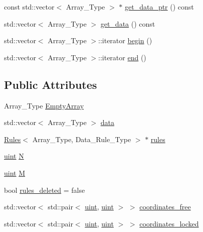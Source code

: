 \textbf{ }\par
\begin{DoxyCompactItemize}
\item 
const std\+::vector$<$ Array\+\_\+\+Type $>$ $\ast$ \hyperlink{classbarry_1_1_power_set_a80b283b1ac115f1be049a09f1a69586a}{get\+\_\+data\+\_\+ptr} () const
\item 
std\+::vector$<$ Array\+\_\+\+Type $>$ \hyperlink{classbarry_1_1_power_set_a53ca37c9cb14abd6f61bc0127ac9d067}{get\+\_\+data} () const
\item 
std\+::vector$<$ Array\+\_\+\+Type $>$\+::iterator \hyperlink{classbarry_1_1_power_set_a0db34800ac228a47917cc9f3e08a88a9}{begin} ()
\item 
std\+::vector$<$ Array\+\_\+\+Type $>$\+::iterator \hyperlink{classbarry_1_1_power_set_a1fb01ffc52e39a831058c480e981da9e}{end} ()
\end{DoxyCompactItemize}

\subsection*{Public Attributes}
\begin{DoxyCompactItemize}
\item 
Array\+\_\+\+Type \hyperlink{classbarry_1_1_power_set_a7709618ce9c3d9346499c7b23b91392a}{Empty\+Array}
\item 
std\+::vector$<$ Array\+\_\+\+Type $>$ \hyperlink{classbarry_1_1_power_set_a90fecd17a9d1f36153c07bc929b1630f}{data}
\item 
\hyperlink{classbarry_1_1_rules}{Rules}$<$ Array\+\_\+\+Type, Data\+\_\+\+Rule\+\_\+\+Type $>$ $\ast$ \hyperlink{classbarry_1_1_power_set_ae8eee09092e96fbefde320ba89fdcbfc}{rules}
\item 
\hyperlink{namespacebarry_a11dfc53ddb4672278319aa04f1e09a6c}{uint} \hyperlink{classbarry_1_1_power_set_adea0f6434b17b3fc391475a11db00c2f}{N}
\item 
\hyperlink{namespacebarry_a11dfc53ddb4672278319aa04f1e09a6c}{uint} \hyperlink{classbarry_1_1_power_set_ae64182a21f9969a2c9fdf73ab23a6c5e}{M}
\item 
bool \hyperlink{classbarry_1_1_power_set_aac868bcdb4a7f6c17d35aa29cf8e5028}{rules\+\_\+deleted} = false
\item 
std\+::vector$<$ std\+::pair$<$ \hyperlink{namespacebarry_a11dfc53ddb4672278319aa04f1e09a6c}{uint}, \hyperlink{namespacebarry_a11dfc53ddb4672278319aa04f1e09a6c}{uint} $>$ $>$ \hyperlink{classbarry_1_1_power_set_a2bc42422f23546d55fef96f053c0c4ea}{coordinates\+\_\+free}
\item 
std\+::vector$<$ std\+::pair$<$ \hyperlink{namespacebarry_a11dfc53ddb4672278319aa04f1e09a6c}{uint}, \hyperlink{namespacebarry_a11dfc53ddb4672278319aa04f1e09a6c}{uint} $>$ $>$ \hyperlink{classbarry_1_1_power_set_a46fa867445a84be388ee62602922980a}{coordinates\+\_\+locked}
\end{DoxyCompactItemize}


